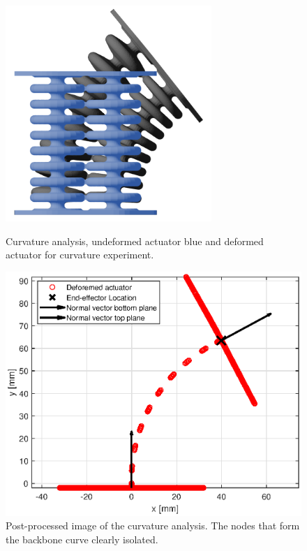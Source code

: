 \begin{figure}[H]
    \centering
\begin{minipage}{0.5\textwidth}
        \centering
        \includegraphics[width=0.695\textwidth]{Figures/Chapter3/curvature.png} 
        \caption{Curvature analysis, undeformed actuator blue and deformed actuator for curvature experiment. }
        \label{fig3:schematiccurvature}
    \end{minipage}\hfill
    \begin{minipage}{0.5\textwidth}
        \centering
        \includegraphics[width=\textwidth]{Figures/Chapter3/rotation60kpa.eps} 
        \caption{Post-processed image of the curvature analysis. The nodes that form the backbone curve clearly isolated.}

\end{minipage}
\end{figure}
